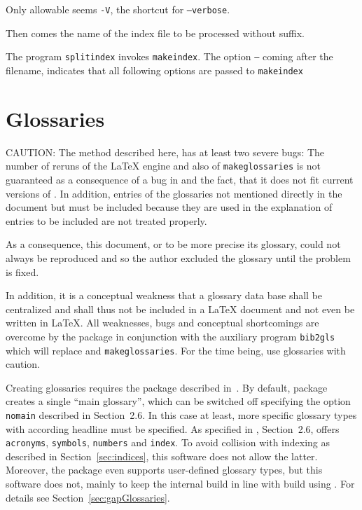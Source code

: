 Only allowable seems \texttt{-V}, the shortcut for \texttt{--verbose}. 

Then comes the name of the index file to be processed 
without suffix. 

The program \texttt{splitindex} invokes \texttt{makeindex}. 
The option \texttt{--} coming after the filename, 
indicates that all following options are passed to \texttt{makeindex} 



\section{Glossaries}\label{sec:glossaries}

CAUTION\@: The method described here, 
has at least two severe bugs: 
The number of reruns of the \LaTeX{} engine and also of \texttt{makeglossaries} 
is not guaranteed as a consequence of a bug in  
and the fact, that it does not fit current versions of . 
In addition, entries of the glossaries not mentioned directly in the document 
but must be included because they are used in the explanation of entries to be included 
are not treated properly. 

As a consequence, this document, or to be more precise its glossary, 
could not always be reproduced and so the author excluded the glossary until the problem is fixed. 

In addition, it is a conceptual weakness that a glossary data base 
shall be centralized and shall thus not be included in a \LaTeX{} document 
and not even be written in \LaTeX. 
All weaknesses, bugs and conceptual shortcomings are overcome 
by the package  in conjunction with the auxiliary program \texttt{bib2gls} 
which will replace  and \texttt{makeglossaries}. 
For the time being, use glossaries with caution. 
\medskip


Creating glossaries 
requires the package  described in~\cite{GloP4_54}. 
By default, package  creates a single ``main glossary'', 
which can be switched off specifying the option \texttt{nomain} 
described in Section~2.6. 
In this case at least, more specific glossary types with according headline must be specified. 
As specified in \cite{GloP4_54}, Section~2.6, 
 offers \texttt{acronyms}, \texttt{symbols},
\texttt{numbers} and \texttt{index}. 
To avoid collision with indexing as described in Section~\ref{sec:indices}, 
this software does not allow the latter. 
Moreover, the package  even supports user-defined glossary types, 
but this software does not, 
mainly to keep the internal build in line with build using . 
For details see Section~\ref{sec:gapGlossaries}. 

